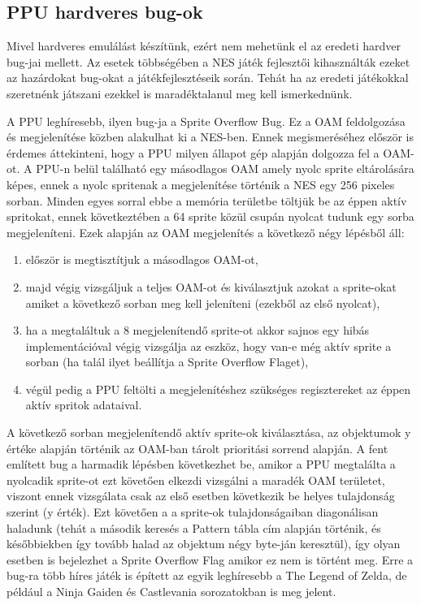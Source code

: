  	 \subsection{PPU hardveres bug-ok}
 	 Mivel hardveres emulálást készítünk, ezért nem mehetünk el az eredeti hardver bug-jai mellett. Az esetek többségében a NES játék fejlesztői kihasználták ezeket az hazárdokat bug-okat a játékfejlesztéseik során. Tehát ha az eredeti játékokkal szeretnénk játszani ezekkel is maradéktalanul meg kell ismerkednünk.
 	 
 	 A PPU leghíresebb, ilyen bug-ja a Sprite Overflow Bug. Ez a OAM feldolgozása és megjelenítése közben alakulhat ki a NES-ben. Ennek megismeréséhez először is érdemes áttekinteni, hogy a PPU milyen állapot gép alapján dolgozza fel a OAM-ot. A PPU-n belül található egy másodlagos OAM amely nyolc sprite eltárolására képes, ennek a nyolc spritenak a megjelenítése történik a NES egy 256 pixeles sorban. Minden egyes sorral ebbe a memória területbe töltjük be az éppen aktív spritokat, ennek következtében a 64 sprite közül csupán nyolcat tudunk egy sorba megjeleníteni. Ezek alapján az OAM megjelenítés a következő négy lépésből áll:
 	  
 	 \begin{enumerate}
 	 	\item először is megtisztítjuk a másodlagos OAM-ot,
 	 	\item majd végig vizsgáljuk a teljes OAM-ot és kiválasztjuk azokat a sprite-okat amiket a következő sorban meg kell jeleníteni (ezekből az első nyolcat),
 	 	\item ha a megtaláltuk a 8 megjelenítendő sprite-ot akkor sajnos egy hibás implementációval végig vizsgálja az eszköz, hogy van-e még aktív sprite a sorban (ha talál ilyet beállítja a Sprite Overflow Flaget),
 	 	\item végül pedig a PPU feltölti a megjelenítéshez szükséges regisztereket az éppen aktív spritok adataival.
 	 \end{enumerate}
 	 
 	 A következő sorban megjelenítendő aktív sprite-ok kiválasztása, az objektumok y értéke alapján történik az OAM-ban tárolt prioritási sorrend alapján. A fent említett bug a harmadik lépésben következhet be, amikor a PPU megtalálta a nyolcadik sprite-ot ezt követően elkezdi vizsgálni a maradék OAM területet, viszont ennek vizsgálata csak az első esetben következik be helyes tulajdonság szerint (y érték). Ezt követően a a sprite-ok tulajdonságaiban diagonálisan haladunk (tehát a második keresés a Pattern tábla cím alapján történik, és későbbiekben így tovább halad az objektum négy byte-ján keresztül), így olyan esetben is bejelezhet a Sprite Overflow Flag amikor ez nem is történt meg. Erre a bug-ra több híres játék is épített az egyik leghíresebb a The Legend of Zelda, de például a Ninja Gaiden és Castlevania sorozatokban is meg jelent.
 	 
